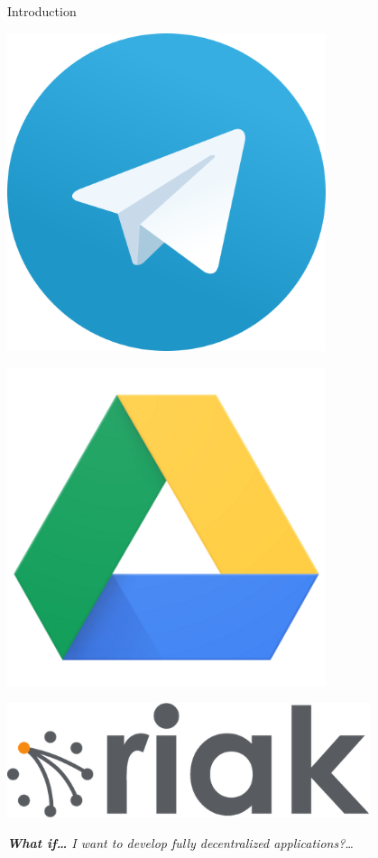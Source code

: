 \documentclass[10pt, xcolor={usenames, dvipsnames}]{beamer}
\begin{document}
\begin{frame}{Introduction}
\begin{minipage}{0.19\textwidth}
    \end{minipage}
    \begin{minipage}{0.19\textwidth}
      \centering
      \includegraphics[width=0.7\textwidth]{logos/telegram.png}
    \end{minipage}    
    \begin{minipage}{0.19\textwidth}
      \centering
      \includegraphics[width=0.7\textwidth]{logos/google.png}
    \end{minipage}
    \begin{minipage}{0.19\textwidth}
      \centering
      \includegraphics[width=0.8\textwidth]{logos/riak.png}
    \end{minipage}

    \vspace{4em}  

    \textit{\textbf{What if\ldots} I want to develop fully decentralized
      applications?\ldots}

\end{frame}
\end{document}
